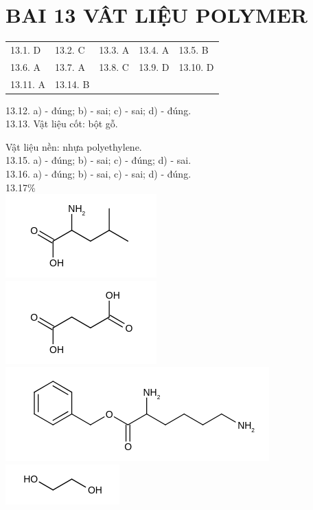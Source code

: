 \documentclass[10pt]{article}
\begin{document}
\section*{BAI 13 VÂT LIỆU POLYMER}
\begin{center}
\begin{tabular}{lllll}
13.1. D & 13.2. C & 13.3. A & 13.4. A & 13.5. B \\
13.6. A & 13.7. A & 13.8. C & 13.9. D & 13.10. D \\
13.11. A & 13.14. B &  &  &  \\
\end{tabular}
\end{center}

13.12. a) - đúng; b) - sai; c) - sai; d) - đúng.\\
13.13. Vật liệu cốt: bột gỗ.

Vật liệu nền: nhựa polyethylene.\\
13.15. a) - đúng; b) - sai; c) - đúng; d) - sai.\\
13.16. a) - đúng; b) - sai, c) - sai; d) - đúng.\\
13.17\%\\
\includegraphics{smile-7933d0a12d1d333811a6a56bfe4cc3114d5b40f1}\\
\includegraphics{smile-d6029b54401fe1ae02b4808b9aaaa5d37509bde0}\\
\includegraphics{smile-8d79f9024eb8bddc2281ded4eaf64bd3383fba75}\\
\includegraphics{smile-25a774e1892adb46bee7e04bbc5c470218b309a5}
\end{document}
